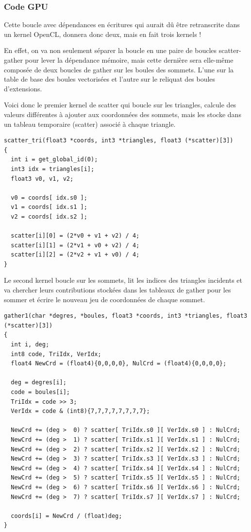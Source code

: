 \documentclass[a4paper,12pt]{article}
\begin{document}
\subsubsection{Code GPU}
Cette boucle avec dépendances en écritures qui aurait dû être retranscrite dans un kernel OpenCL, donnera donc deux, mais en fait trois kernels !

En effet, on va non seulement séparer la boucle en une paire de boucles scatter-gather pour lever la dépendance mémoire, mais cette dernière sera elle-même composée de deux boucles de gather sur les boules des sommets. L'une sur la table de base des boules vectorisées et l'autre sur le reliquat des boules d'extensions.

Voici donc le premier kernel de scatter qui boucle sur les triangles, calcule des valeurs différentes à ajouter aux coordonnées des sommets, mais les stocke dans un tableau temporaire (scatter) associé à chaque triangle.

\begin{tt}
\begin{verbatim}
scatter_tri(float3 *coords, int3 *triangles, float3 (*scatter)[3])
{
  int i = get_global_id(0);
  int3 idx = triangles[i];
  float3 v0, v1, v2;

  v0 = coords[ idx.s0 ];
  v1 = coords[ idx.s1 ];
  v2 = coords[ idx.s2 ];

  scatter[i][0] = (2*v0 + v1 + v2) / 4;
  scatter[i][1] = (2*v1 + v0 + v2) / 4;
  scatter[i][2] = (2*v2 + v1 + v0) / 4;
}
\end{verbatim}
\end{tt}
\normalfont

Le second kernel boucle sur les sommets, lit les indices des triangles incidents et va chercher leurs contributions stockées dans les tableaux de gather pour les sommer et écrire le nouveau jeu de coordonnées de chaque sommet.

\begin{tt}
\begin{verbatim}
gather1(char *degres, *boules, float3 *coords, int3 *triangles, float3 (*scatter)[3])
{
  int i, deg;
  int8 code, TriIdx, VerIdx;
  float4 NewCrd = (float4){0,0,0,0}, NulCrd = (float4){0,0,0,0};

  deg = degres[i];
  code = boules[i];
  TriIdx = code >> 3;
  VerIdx = code & (int8){7,7,7,7,7,7,7,7};

  NewCrd += (deg >  0) ? scatter[ TriIdx.s0 ][ VerIdx.s0 ] : NulCrd;
  NewCrd += (deg >  1) ? scatter[ TriIdx.s1 ][ VerIdx.s1 ] : NulCrd;
  NewCrd += (deg >  2) ? scatter[ TriIdx.s2 ][ VerIdx.s2 ] : NulCrd;
  NewCrd += (deg >  3) ? scatter[ TriIdx.s3 ][ VerIdx.s3 ] : NulCrd;
  NewCrd += (deg >  4) ? scatter[ TriIdx.s4 ][ VerIdx.s4 ] : NulCrd;
  NewCrd += (deg >  5) ? scatter[ TriIdx.s5 ][ VerIdx.s5 ] : NulCrd;
  NewCrd += (deg >  6) ? scatter[ TriIdx.s6 ][ VerIdx.s6 ] : NulCrd;
  NewCrd += (deg >  7) ? scatter[ TriIdx.s7 ][ VerIdx.s7 ] : NulCrd;

  coords[i] = NewCrd / (float)deg;
}
\end{verbatim}
\end{tt}
\normalfont
\end{document}
